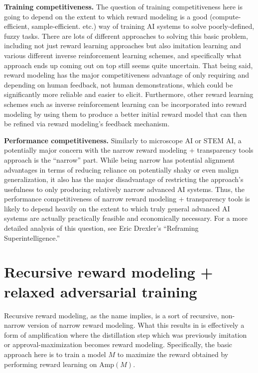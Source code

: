 \textbf{Training competitiveness.} The question of training competitiveness here is going to depend on the extent to which reward modeling is a good (compute-efficient, sample-efficient. etc.) way of training AI systems to solve poorly-defined, fuzzy tasks. There are lots of different approaches to solving this basic problem, including not just reward learning approaches but also imitation learning and various\cite{TODO: cite https://arxiv.org/abs/1606.03476} different\cite{TODO: cite https://arxiv.org/abs/1710.11248} inverse reinforcement learning schemes, and specifically what approach ends up coming out on top still seems quite uncertain. That being said, reward modeling has the major competitiveness advantage of only requiring and depending on human feedback, not human demonstrations, which could be significantly more reliable and easier to elicit. Furthermore, other reward learning schemes such as inverse reinforcement learning can be incorporated into reward modeling by using them to produce a better initial reward model that can then be refined via reward modeling's feedback mechanism.

\textbf{Performance competitiveness.} Similarly to microscope AI or STEM AI, a potentially major concern with the narrow reward modeling + transparency tools approach is the ``narrow'' part. While being narrow has potential alignment advantages in terms of reducing reliance on potentially shaky or even malign generalization, it also has the major disadvantage of restricting the approach's usefulness to only producing relatively narrow advanced AI systems. Thus, the performance competitiveness of narrow reward modeling + transparency tools is likely to depend heavily on the extent to which truly general advanced AI systems are actually practically feasible and economically necessary. For a more detailed analysis of this question, see Eric Drexler's ``Reframing Superintelligence\cite{TODO: cite https://www.fhi.ox.ac.uk/wp-content/uploads/Reframing_Superintelligence_FHI-TR-2019-1.1-1.pdf}.''

\section{Recursive reward modeling + relaxed adversarial training}
\label{sec:8}

Recursive reward modeling\cite{TODO: cite https://medium.com/@deepmindsafetyresearch/scalable-agent-alignment-via-reward-modeling-bf4ab06dfd84}, as the name implies, is a sort of recursive, non-narrow version of narrow reward modeling. What this results in is effectively a form of amplification where the distillation step which was previously imitation or approval-maximization becomes reward modeling. Specifically, the basic approach here is to train a model $M$ to maximize the reward obtained by performing reward learning on $\text{Amp}(M)$.

